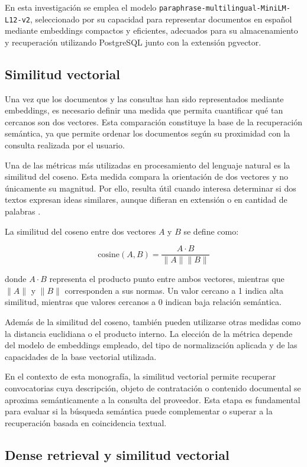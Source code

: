 En esta investigación se emplea el modelo \texttt{paraphrase-multilingual-MiniLM-L12-v2}, seleccionado por su capacidad para representar documentos en español mediante embeddings compactos y eficientes, adecuados para su almacenamiento y recuperación utilizando PostgreSQL junto con la extensión pgvector.

\subsection{Similitud vectorial}

Una vez que los documentos y las consultas han sido representados mediante embeddings, es necesario definir una medida que permita cuantificar qué tan cercanos son dos vectores. Esta comparación constituye la base de la recuperación semántica, ya que permite ordenar los documentos según su proximidad con la consulta realizada por el usuario.

Una de las métricas más utilizadas en procesamiento del lenguaje natural es la similitud del coseno. Esta medida compara la orientación de dos vectores y no únicamente su magnitud. Por ello, resulta útil cuando interesa determinar si dos textos expresan ideas similares, aunque difieran en extensión o en cantidad de palabras \parencite{manning2008ir}.

La similitud del coseno entre dos vectores \(A\) y \(B\) se define como:

\[
\text{cosine}(A,B) = \frac{A \cdot B}{\|A\| \|B\|}
\]

donde \(A \cdot B\) representa el producto punto entre ambos vectores, mientras que \(\|A\|\) y \(\|B\|\) corresponden a sus normas. Un valor cercano a 1 indica alta similitud, mientras que valores cercanos a 0 indican baja relación semántica.

Además de la similitud del coseno, también pueden utilizarse otras medidas como la distancia euclidiana o el producto interno. La elección de la métrica depende del modelo de embeddings empleado, del tipo de normalización aplicada y de las capacidades de la base vectorial utilizada.

En el contexto de esta monografía, la similitud vectorial permite recuperar convocatorias cuya descripción, objeto de contratación o contenido documental se aproxima semánticamente a la consulta del proveedor. Esta etapa es fundamental para evaluar si la búsqueda semántica puede complementar o superar a la recuperación basada en coincidencia textual.

\subsection{Dense retrieval y similitud vectorial}

